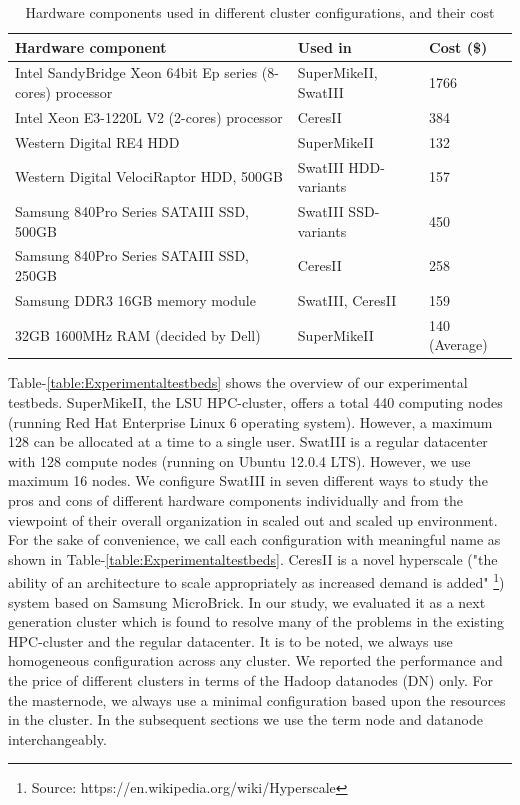 \documentclass[conference]{IEEEtran}
\begin{document}
\begin{table}
	\begin{tabular}{ |p{4.4cm} |p{1.6cm} |p{1.6cm} |} \hline
		Hardware component & Used in & Cost (\$)\\ \hline
		Intel SandyBridge Xeon 64bit Ep series (8-cores) processor & SuperMikeII, SwatIII & 1766\\ \hline
		Intel Xeon E3-1220L V2 (2-cores) processor& CeresII & 384\\ \hline
		Western Digital RE4 HDD & SuperMikeII & 132\\ \hline
		Western Digital VelociRaptor HDD, 500GB & SwatIII HDD-variants & 157 \\ \hline
		Samsung 840Pro Series SATAIII SSD, 500GB & SwatIII SSD-variants & 450\\ \hline
		Samsung 840Pro Series SATAIII SSD, 250GB & CeresII & 258\\ \hline
		Samsung DDR3 16GB memory module & SwatIII, CeresII & 159\\ \hline
		32GB 1600MHz RAM (decided by Dell) & SuperMikeII  & 140 (Average)\\ \hline
	\end{tabular}
	\caption{Hardware components used in different cluster configurations, and their cost}
	\label{table:PriceOfEachComponent}
\vspace{-2.3em}
\end{table}
Table-\ref{table:Experimentaltestbeds} shows the overview of our experimental testbeds. SuperMikeII, the LSU HPC-cluster, offers a total 440 computing nodes (running Red Hat Enterprise Linux 6 operating system). However, a maximum 128 can be allocated at a time to a single user. SwatIII is a regular datacenter with 128 compute nodes (running on Ubuntu 12.0.4 LTS). However, we use maximum 16 nodes. We configure SwatIII in seven different ways to study the pros and cons of different hardware components individually and from the viewpoint of their overall organization in scaled out and scaled up environment. For the sake of convenience, we call each configuration with meaningful name as shown in Table-\ref{table:Experimentaltestbeds}. CeresII is a novel hyperscale ("the ability of an architecture to scale appropriately as increased demand is added" \footnote{Source: https://en.wikipedia.org/wiki/Hyperscale}) system based on Samsung MicroBrick. In our study, we evaluated it as a next generation cluster which is found to resolve many of the problems in the existing HPC-cluster and the regular datacenter. It is to be noted, we always use homogeneous configuration across any cluster. We reported the performance and the price of different clusters in terms of the Hadoop datanodes (DN) only. For the masternode, we always use a minimal configuration based upon the resources in the cluster. In the subsequent sections we use the term node and datanode interchangeably.
\end{document}
